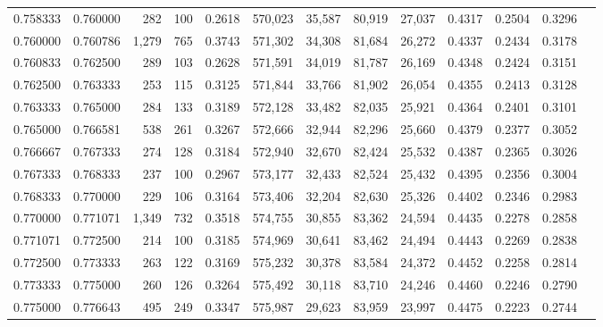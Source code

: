 \begin{tabular}{rrrrrrrrrrrrr}
0.758333 & 0.760000 &   282 & 100 &                                     0.2618 & 570,023 &  35,587 &  80,919 &  27,037 & 0.4317 & 0.2504 & 0.3296 \\
0.760000 & 0.760786 & 1,279 & 765 &                                     0.3743 & 571,302 &  34,308 &  81,684 &  26,272 & 0.4337 & 0.2434 & 0.3178 \\
0.760833 & 0.762500 &   289 & 103 &                                     0.2628 & 571,591 &  34,019 &  81,787 &  26,169 & 0.4348 & 0.2424 & 0.3151 \\
0.762500 & 0.763333 &   253 & 115 &                                     0.3125 & 571,844 &  33,766 &  81,902 &  26,054 & 0.4355 & 0.2413 & 0.3128 \\
0.763333 & 0.765000 &   284 & 133 &                                     0.3189 & 572,128 &  33,482 &  82,035 &  25,921 & 0.4364 & 0.2401 & 0.3101 \\
0.765000 & 0.766581 &   538 & 261 &                                     0.3267 & 572,666 &  32,944 &  82,296 &  25,660 & 0.4379 & 0.2377 & 0.3052 \\
0.766667 & 0.767333 &   274 & 128 &                                     0.3184 & 572,940 &  32,670 &  82,424 &  25,532 & 0.4387 & 0.2365 & 0.3026 \\
0.767333 & 0.768333 &   237 & 100 &                                     0.2967 & 573,177 &  32,433 &  82,524 &  25,432 & 0.4395 & 0.2356 & 0.3004 \\
0.768333 & 0.770000 &   229 & 106 &                                     0.3164 & 573,406 &  32,204 &  82,630 &  25,326 & 0.4402 & 0.2346 & 0.2983 \\
0.770000 & 0.771071 & 1,349 & 732 &                                     0.3518 & 574,755 &  30,855 &  83,362 &  24,594 & 0.4435 & 0.2278 & 0.2858 \\
0.771071 & 0.772500 &   214 & 100 &                                     0.3185 & 574,969 &  30,641 &  83,462 &  24,494 & 0.4443 & 0.2269 & 0.2838 \\
0.772500 & 0.773333 &   263 & 122 &                                     0.3169 & 575,232 &  30,378 &  83,584 &  24,372 & 0.4452 & 0.2258 & 0.2814 \\
0.773333 & 0.775000 &   260 & 126 &                                     0.3264 & 575,492 &  30,118 &  83,710 &  24,246 & 0.4460 & 0.2246 & 0.2790 \\
0.775000 & 0.776643 &   495 & 249 &                                     0.3347 & 575,987 &  29,623 &  83,959 &  23,997 & 0.4475 & 0.2223 & 0.2744 \\

\end{tabular}
